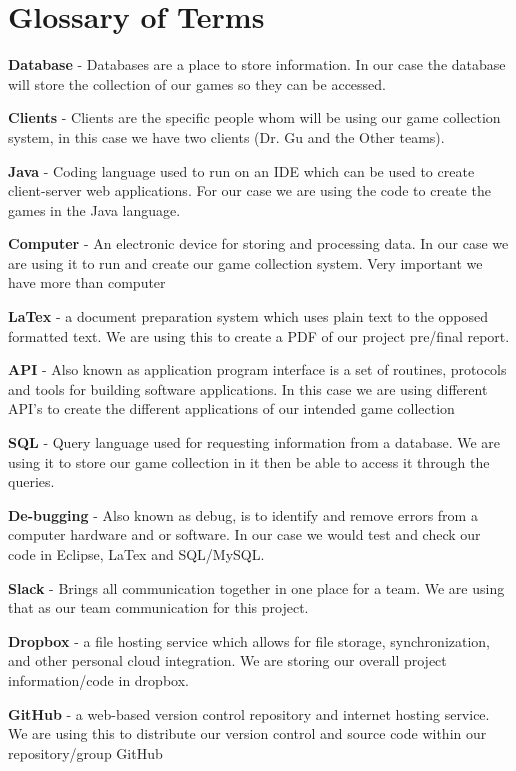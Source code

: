 \documentclass[11pt,a4paper]{article}
\begin{document}


\section{Glossary of Terms}

\textbf{Database} - Databases are a place to store information. In our case the database will store the collection of our games so they can be accessed. 

\textbf{Clients} - Clients are the specific people whom will be using our game collection system, in this case we have two clients (Dr. Gu and the Other teams).

\textbf{Java} - Coding language used to run on an IDE which can be used to create client-server web applications. For our case we are using the code to create the games in the Java language. 

\textbf{Computer} - An electronic device for storing and processing data. In our case we are using it to run and create our game collection system. Very important we have more than computer

\textbf{LaTex} - a document preparation system which uses plain text to the opposed formatted text. We are using this to create a PDF of our project pre/final report. 

\textbf{API} - Also known as application program interface is a set of routines, protocols and tools for building software applications. In this case we are using different API's to create the different applications of our intended game collection

\textbf{SQL} - Query language used for requesting information from a database. We are using it to store our game collection in it then be able to access it through the queries.

\textbf{De-bugging} - Also known as debug, is to identify and remove errors from a computer hardware and or software. In our case we would test and check our code in Eclipse, LaTex and SQL/MySQL.

\textbf{Slack} - Brings all communication together in one place for a team. We are using that as our team communication for this project.

\textbf{Dropbox} - a file hosting service which allows for file storage, synchronization, and other personal cloud integration. We are storing our overall project information/code in dropbox.

\textbf{GitHub} - a web-based version control repository and internet hosting service. We are using this to distribute our version control and source code within our repository/group GitHub
\end{document}

